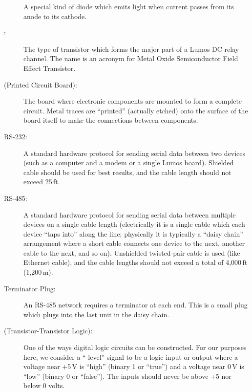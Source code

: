 \documentclass[letterpaper,twoside,onecolumn,openright,final]{memoir}
\begin{document}
\begin{description}
		A special kind of diode which emits light when current passes from its anode to its cathode.
	\item[\acronym{MOSFET}:]
		The type of transistor which forms the major part of a Lumos DC relay channel.  The name
		is an acronym for Metal Oxide Semiconductor Field Effect Transistor.
	\item[\acronym{PCB} (Printed Circuit Board):]
		The board where electronic components are mounted to form a complete circuit.  Metal
		traces are ``printed'' (actually etched) onto the surface of the board itself to make the
		connections between components.
	\item[RS-232:]
		A standard hardware protocol for sending serial data between two devices (such as a computer
		and a modem or a single Lumos board).  Shielded cable should be used for best results, and
		the cable length should not exceed 25\,ft.
	\item[RS-485:]
		A standard hardware protocol for sending serial data between multiple devices on a single
		cable length (electrically it is a single cable which each device ``taps into'' along the
		line; physically it is typically a ``daisy chain'' arrangement where a short cable connects
		one device to the next, another cable to the next, and so on). Unshielded twisted-pair cable
		is used (like Ethernet cable), and the cable lengths should not exceed a total of 4,000\,ft
		(1,200\,m).
	\item[Terminator Plug:]
		An RS-485 network requires a terminator at each end.  This is a small plug which plugs into
		the last unit in the daisy chain.
	\item[\acronym{TTL} (Transistor-Transistor Logic):] One of the ways digital logic circuits can be
		constructed.  For our purposes here, we consider a ``-level'' signal to be a
		logic input or output where a voltage near +5\,V is ``high'' (binary 1 or ``true'') and a
		voltage near 0\,V is ``low'' (binary 0 or ``false'').  The inputs should never be above
		+5 nor below 0 volts.
\end{description}



\indexintoc
\printindex
\clearpage


\end{document}
